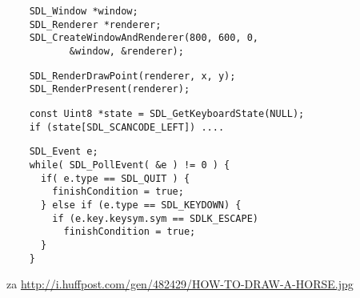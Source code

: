 \documentclass{beamer}
\begin{document}
\begin{frame}[fragile]
	\begin{verbatim}
	SDL_Window *window;
	SDL_Renderer *renderer;
	SDL_CreateWindowAndRenderer(800, 600, 0, 
	       &window, &renderer);
 	\end{verbatim}
 	\EB
\end{frame}
\begin{frame}[fragile]
	\begin{verbatim}
	SDL_RenderDrawPoint(renderer, x, y);
	SDL_RenderPresent(renderer);
 	\end{verbatim}
 	\EB
\end{frame}
\begin{frame}[fragile]
	\begin{verbatim}
	const Uint8 *state = SDL_GetKeyboardState(NULL);
	if (state[SDL_SCANCODE_LEFT]) ....
 	\end{verbatim}
 	\EB
\end{frame}
\begin{frame}[fragile]
	\begin{verbatim}
	SDL_Event e;
	while( SDL_PollEvent( &e ) != 0 ) { 
	  if( e.type == SDL_QUIT ) { 
	    finishCondition = true;
	  } else if (e.type == SDL_KEYDOWN) {
	    if (e.key.keysym.sym == SDLK_ESCAPE)
	      finishCondition = true;
	  }
	}
 	\end{verbatim}
 	\EB
\end{frame}
\begin{frame}[fragile]
 	\EB
 	{\small{za \url{http://i.huffpost.com/gen/482429/HOW-TO-DRAW-A-HORSE.jpg}}}
\end{frame}
\end{document}
